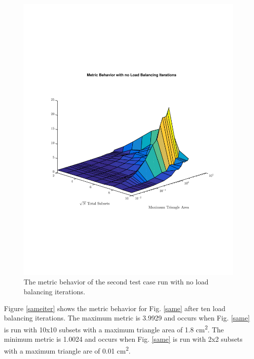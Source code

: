 \documentclass{anstrans}
\begin{document}
\begin{figure}
\centering
\includegraphics[scale=0.5, trim = 2cm 5cm 0cm 5cm,clip]{figures/SameNoIter.pdf}
\caption{The metric behavior of the second test case run with no load balancing iterations.}
\label{samenoiter}
\end{figure}

Figure \ref{sameiter} shows the metric behavior for Fig. \ref{same} after ten load balancing iterations. The maximum metric is 3.9929 and occurs when Fig. \ref{same} is run with 10x10 subsets with a maximum triangle area of 1.8 cm\textsuperscript{2}. The minimum metric is 1.0024 and occurs when Fig. \ref{same} is run with 2x2 subsets with a maximum triangle are of 0.01 cm\textsuperscript{2}.
\end{document}
